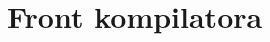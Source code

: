 \documentclass[10pt,t]{beamer}
\begin{document}
\begin{frame}







\end{frame}








\section{Front kompilatora}
\end{document}
